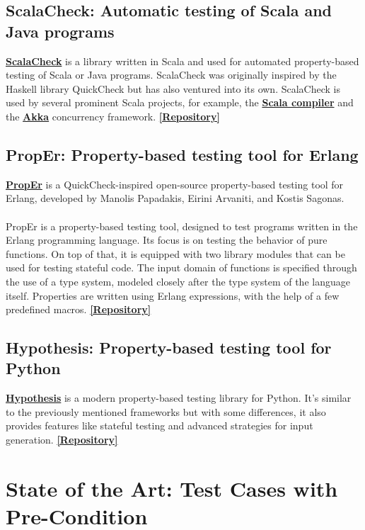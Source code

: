\documentclass{report}
\theoremstyle{definition}
\theoremstyle{definition}
\newcommand{\bhref}[2]{\textbf{\href{#1}{#2}}}
\newcommand{\repo}[1]{\bhref{#1}{[Repository]}}
\begin{document}
\subsection{ScalaCheck: Automatic testing of Scala and Java programs}

\bhref{https://scalacheck.org/index.html}{ScalaCheck} is a library written in Scala and used for automated property-based testing of Scala or Java programs. ScalaCheck was originally inspired by the Haskell library QuickCheck but has also ventured into its own. ScalaCheck is used by several prominent Scala projects, for example, the \bhref{https://www.scala-lang.org/}{Scala compiler} and the \bhref{https://akka.io/}{Akka} concurrency framework. \repo{https://github.com/typelevel/scalacheck}

\subsection{PropEr: Property-based testing tool for Erlang}

\bhref{https://proper-testing.github.io/}{PropEr} is a QuickCheck-inspired open-source property-based testing tool for Erlang, developed by Manolis Papadakis, Eirini Arvaniti, and Kostis Sagonas.\\\\
PropEr is a property-based testing tool, designed to test programs written in the Erlang programming language. Its focus is on testing the behavior of pure functions. On top of that, it is equipped with two library modules that can be used for testing stateful code. The input domain of functions is specified through the use of a type system, modeled closely after the type system of the language itself. Properties are written using Erlang expressions, with the help of a few predefined macros. \repo{https://github.com/proper-testing/proper}

\subsection{Hypothesis: Property-based testing tool for Python}

\bhref{https://hypothesis.readthedocs.io/en/latest/}{Hypothesis} is a modern property-based testing library for Python. It's similar to the previously mentioned frameworks but with some differences, it also provides features like stateful testing and advanced strategies for input generation. \repo{https://github.com/HypothesisWorks/hypothesis}

\section{State of the Art: Test Cases with Pre-Condition}
\end{document}
